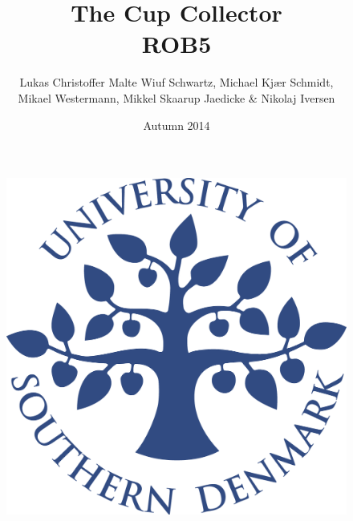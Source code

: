 \title{The Cup Collector \\ROB5}
\author{Lukas Christoffer Malte Wiuf Schwartz, Michael Kjær Schmidt, \\Mikael Westermann, Mikkel Skaarup Jaedicke \& Nikolaj Iversen}
\date{Autumn 2014}
\begin{figure}
\centering
\includegraphics[width=1\textwidth]{graphics/forside.png}
\end{figure}
\maketitle

